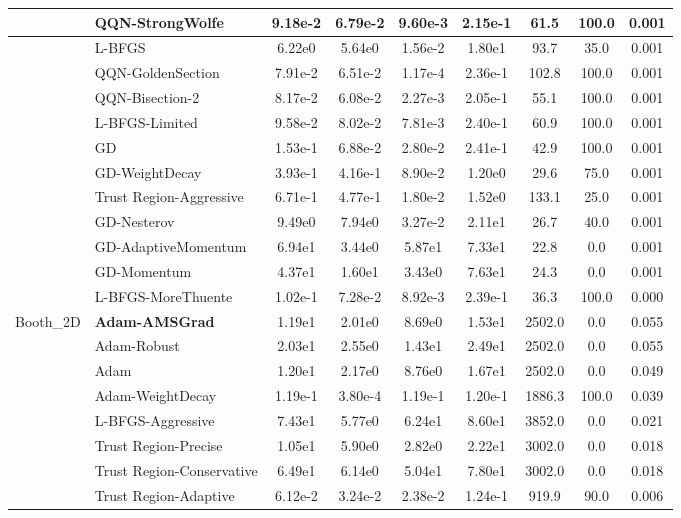 \documentclass[10pt]{article}
\begin{document}
\begin{longtable}{|l|l|c|c|c|c|c|c|c|}
\hline
 & QQN-StrongWolfe & 9.18e-2 & 6.79e-2 & 9.60e-3 & 2.15e-1 & 61.5 & 100.0 & 0.001 \\
\hline
 & L-BFGS & 6.22e0 & 5.64e0 & 1.56e-2 & 1.80e1 & 93.7 & 35.0 & 0.001 \\
\hline
 & QQN-GoldenSection & 7.91e-2 & 6.51e-2 & 1.17e-4 & 2.36e-1 & 102.8 & 100.0 & 0.001 \\
\hline
 & QQN-Bisection-2 & 8.17e-2 & 6.08e-2 & 2.27e-3 & 2.05e-1 & 55.1 & 100.0 & 0.001 \\
\hline
 & L-BFGS-Limited & 9.58e-2 & 8.02e-2 & 7.81e-3 & 2.40e-1 & 60.9 & 100.0 & 0.001 \\
\hline
 & GD & 1.53e-1 & 6.88e-2 & 2.80e-2 & 2.41e-1 & 42.9 & 100.0 & 0.001 \\
\hline
 & GD-WeightDecay & 3.93e-1 & 4.16e-1 & 8.90e-2 & 1.20e0 & 29.6 & 75.0 & 0.001 \\
\hline
 & Trust Region-Aggressive & 6.71e-1 & 4.77e-1 & 1.80e-2 & 1.52e0 & 133.1 & 25.0 & 0.001 \\
\hline
 & GD-Nesterov & 9.49e0 & 7.94e0 & 3.27e-2 & 2.11e1 & 26.7 & 40.0 & 0.001 \\
\hline
 & GD-AdaptiveMomentum & 6.94e1 & 3.44e0 & 5.87e1 & 7.33e1 & 22.8 & 0.0 & 0.001 \\
\hline
 & GD-Momentum & 4.37e1 & 1.60e1 & 3.43e0 & 7.63e1 & 24.3 & 0.0 & 0.001 \\
\hline
 & L-BFGS-MoreThuente & 1.02e-1 & 7.28e-2 & 8.92e-3 & 2.39e-1 & 36.3 & 100.0 & 0.000 \\
Booth\_2D & \textbf{Adam-AMSGrad} & 1.19e1 & 2.01e0 & 8.69e0 & 1.53e1 & 2502.0 & 0.0 & 0.055 \\
\hline
 & Adam-Robust & 2.03e1 & 2.55e0 & 1.43e1 & 2.49e1 & 2502.0 & 0.0 & 0.055 \\
\hline
 & Adam & 1.20e1 & 2.17e0 & 8.76e0 & 1.67e1 & 2502.0 & 0.0 & 0.049 \\
\hline
 & Adam-WeightDecay & 1.19e-1 & 3.80e-4 & 1.19e-1 & 1.20e-1 & 1886.3 & 100.0 & 0.039 \\
\hline
 & L-BFGS-Aggressive & 7.43e1 & 5.77e0 & 6.24e1 & 8.60e1 & 3852.0 & 0.0 & 0.021 \\
\hline
 & Trust Region-Precise & 1.05e1 & 5.90e0 & 2.82e0 & 2.22e1 & 3002.0 & 0.0 & 0.018 \\
\hline
 & Trust Region-Conservative & 6.49e1 & 6.14e0 & 5.04e1 & 7.80e1 & 3002.0 & 0.0 & 0.018 \\
\hline
 & Trust Region-Adaptive & 6.12e-2 & 3.24e-2 & 2.38e-2 & 1.24e-1 & 919.9 & 90.0 & 0.006 \\
\hline

\end{longtable}
\end{document}

